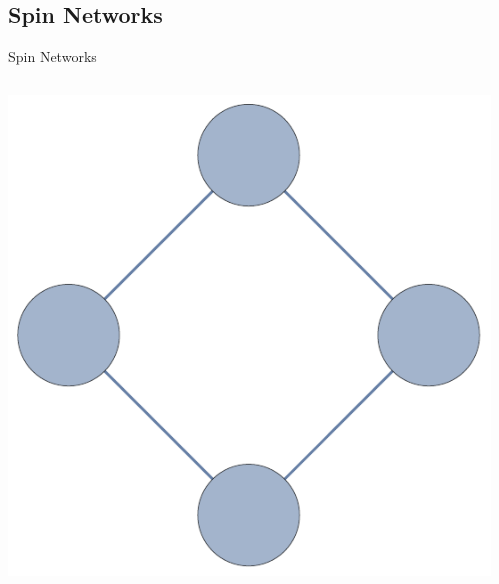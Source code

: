\documentclass{beamer}
\begin{document}
\subsection{Spin Networks}
\begin{frame}[t]{Spin Networks}
	\begin{columns}[T]
		\begin{column}{0.33\textwidth}
			\centering
   			\includegraphics[width=\textwidth]{Images/ring4_nolabels}
		\end{column}
		\begin{column}{0.33\textwidth}
			\centering

\end{column}
\end{columns}
\end{frame}
\end{document}
